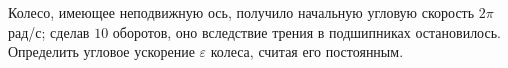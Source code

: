 Колесо, имеющее неподвижную ось, получило начальную угловую скорость
$2\pi$ рад/с; сделав $10$ оборотов, оно вследствие трения в подшипниках
остановилось. Определить угловое ускорение $\varepsilon$ колеса, считая
его постоянным.
